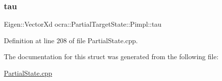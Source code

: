 \subsubsection{\texorpdfstring{tau}{tau}}
{\footnotesize\ttfamily Eigen\+::\+Vector\+Xd ocra\+::\+Partial\+Target\+State\+::\+Pimpl\+::tau}



Definition at line 208 of file Partial\+State.\+cpp.



The documentation for this struct was generated from the following file\+:\begin{DoxyCompactItemize}
\item 
\hyperlink{PartialState_8cpp}{Partial\+State.\+cpp}\end{DoxyCompactItemize}
